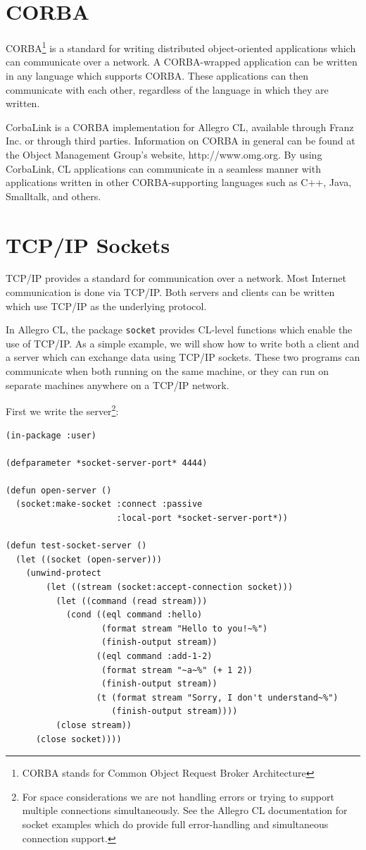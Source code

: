\section{CORBA}

CORBA\footnote{CORBA stands for Common Object Request Broker Architecture} is a standard for writing distributed object-oriented applications which
can communicate over a network. A CORBA-wrapped application can be written in any
language which supports CORBA. These applications can then communicate with each
other, regardless of the language in which they are written.

CorbaLink is a CORBA implementation for Allegro CL, available through Franz Inc. or
through third parties. Information on CORBA in general can be found at the Object Management Group's website, http://www.omg.org. By using CorbaLink, CL applications can
communicate in a seamless manner with applications written in other CORBA-supporting
languages such as C++, Java, Smalltalk, and others.

\section{TCP/IP Sockets}

TCP/IP provides a standard for communication over a network. Most Internet communication is done via TCP/IP. Both servers and clients can be written which use TCP/IP as the
underlying protocol.

In Allegro CL, the package \texttt{socket} provides CL-level functions which enable the use of
TCP/IP. As a simple example, we will show how to write both a client and a server which
can exchange data using TCP/IP sockets. These two programs can communicate when both
running on the same machine, or they can run on separate machines anywhere on a TCP/IP
network.

First we write the server\footnote{For space considerations we are not handling errors or trying to support multiple connections simultaneously.
See the Allegro CL documentation for socket examples which do provide full error-handling and simultaneous
connection support.}:

\begin{verbatim}
(in-package :user)

(defparameter *socket-server-port* 4444)

(defun open-server ()
  (socket:make-socket :connect :passive
                      :local-port *socket-server-port*))

(defun test-socket-server ()
  (let ((socket (open-server)))
    (unwind-protect
        (let ((stream (socket:accept-connection socket)))
          (let ((command (read stream)))
            (cond ((eql command :hello)
                   (format stream "Hello to you!~%")
                   (finish-output stream))
                  ((eql command :add-1-2)
                   (format stream "~a~%" (+ 1 2))
                   (finish-output stream))
                  (t (format stream "Sorry, I don't understand~%")
                     (finish-output stream))))
          (close stream))
      (close socket))))
\end{verbatim}

